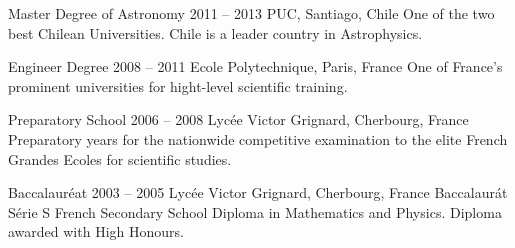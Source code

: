 



\begin{coordinatelist}
\end{coordinatelist}




\begin{yearlist}
\item[Master Degree of Astronomy]{2011 -- 2013}
	{PUC, Santiago, Chile}
    {One of the two best Chilean Universities. 
    Chile is a leader country in Astrophysics.}

\item[Engineer Degree]{2008 -- 2011}
	{Ecole Polytechnique, Paris, France}
    {One of France's prominent universities for hight-­level scientific training.}


\item[Preparatory School]{2006 -- 2008}
	{Lyc\'ee Victor Grignard, Cherbourg, France}
	{Preparatory years for the nationwide competitive examination to the elite French Grandes Ecoles for scientific studies.  }


\item[Baccalaur\'eat]{2003 -- 2005}
	{Lyc\'ee Victor Grignard, Cherbourg, France}
	{Baccalaur\'at S\'erie S French Secondary School Diploma in Mathematics and Physics. 
    Diploma awarded with High Honours.}

\end{yearlist}


